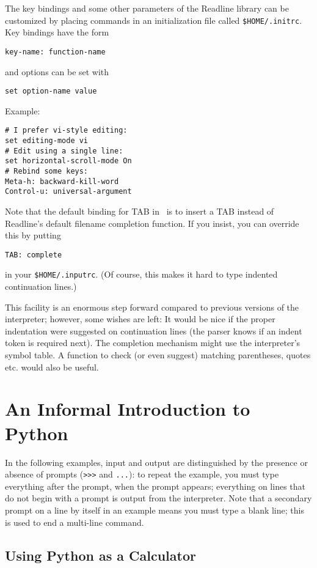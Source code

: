 The key bindings and some other parameters of the Readline library can
be customized by placing commands in an initialization file called
{\tt \$HOME/.initrc}.
Key bindings have the form
\bcode\begin{verbatim}
key-name: function-name
\end{verbatim}\ecode
and options can be set with
\bcode\begin{verbatim}
set option-name value
\end{verbatim}\ecode
Example:
\bcode\begin{verbatim}
# I prefer vi-style editing:
set editing-mode vi
# Edit using a single line:
set horizontal-scroll-mode On
# Rebind some keys:
Meta-h: backward-kill-word
Control-u: universal-argument
\end{verbatim}\ecode
Note that the default binding for TAB in \Python\ is to insert a TAB
instead of Readline's default filename completion function.
If you insist, you can override this by putting
\bcode\begin{verbatim}
TAB: complete
\end{verbatim}\ecode
in your
{\tt \$HOME/.inputrc}.
(Of course, this makes it hard to type indented continuation lines.)

This facility is an enormous step forward compared to previous versions of
the interpreter; however, some wishes are left:
It would be nice if the proper indentation were suggested on
continuation lines (the parser knows if an indent token is required
next).
The completion mechanism might use the interpreter's symbol table.
A function to check (or even suggest) matching parentheses, quotes
etc. would also be useful.

\section{An Informal Introduction to Python}

In the following examples, input and output are distinguished by the
presence or absence of prompts ({\tt >>>} and {\tt ...}): to repeat the
example, you must type everything after the prompt, when the prompt
appears; everything on lines that do not begin with a prompt is output
from the interpreter.
Note that a secondary prompt on a line by itself in an example means you
must type a blank line; this is used to end a multi-line command.

\subsection{Using Python as a Calculator}

